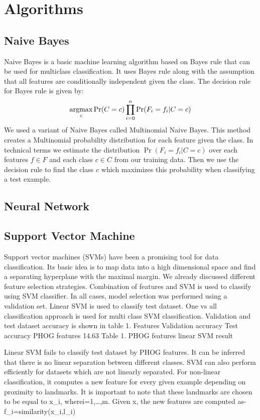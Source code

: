 \documentclass[10pt,twocolumn]{article}
\newcommand{\argmax}{\operatornamewithlimits{argmax}}
\begin{document}
\section{Algorithms}
\subsection{Naive Bayes}
Naive Bayes is a basic machine learning algorithm based on Bayes rule that can be used for multiclass classification. It uses Bayes rule along with the assumption that all features are conditionally independent given the class. The decision rule for Bayes rule is given by:
\[ \argmax_c \Pr(C = c) \prod_{i=0}^{n} \Pr(F_i = f_i | C = c)\]
We used a variant of Naive Bayes called Multinomial Naive Bayes. This method creates a Multinomial probability distribution for each feature given the class. In technical terms we estimate the distribution $\Pr(F_i = f_i | C = c)$ over each features $f \in F$ and each class $ c \in C$ from our training data. Then we use the decision rule to find the class $c$ which maximizes this probability when classifying a test example.
\subsection{Neural Network}
\subsection{Support Vector Machine}
Support vector machines (SVMs) have been a promising tool for data classification. Its basic idea is to map data into a high dimensional space and find a separating hyperplane with the maximal margin.
We already discussed different feature selection strategies. \cite {chen2006combining} Combination of features and SVM is used to classify using SVM classifier. In all cases, model selection was performed using a validation set. Linear SVM is used to classify test dataset. One vs all classification approach is used for multi class SVM classification. Validation and test dataset accuracy is shown in table 1.
Features	Validation accuracy	Test accuracy
PHOG features	14.63%
Table 1. PHOG features linear SVM result

Linear SVM fails to classify test dataset by PHOG features. It can be inferred that there is no linear separation between different classes.
SVM can also perform efficiently for datasets which are not linearly separated. For non-linear classification, it computes a new feature for every given example depending on proximity to landmarks. It is important to note that these landmarks are chosen to be equal to x_i, wherei=1,…,m. Given x, the new features are computed as-
f_i=similarity(x_i,l_i)
 
\end{document}
